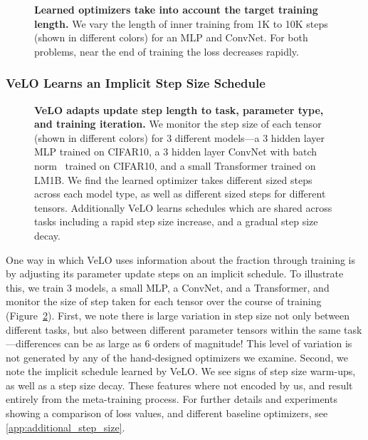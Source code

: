 \documentclass[11pt]{article}
\begin{document}
\begin{figure}
    \centering
    \caption{\textbf{Learned optimizers take into account the target training length.} We vary the length of inner training from 1K to 10K steps (shown in different colors) for an MLP and ConvNet.
    For both problems, near the end of training the loss decreases rapidly.
    \label{fig:num_step_aware}
    }
\end{figure}

\subsubsection{VeLO Learns an Implicit Step Size Schedule}\label{sec:different_sized_steps}
\begin{figure}
    \centering
    \caption{\textbf{VeLO adapts update step length to task, parameter type, and training iteration.}
    We monitor the step size of each tensor (shown in different colors) for 3 different models---a 3 hidden layer MLP trained on CIFAR10, a 3 hidden layer ConvNet with batch norm~\citep{Ioffe15} trained on CIFAR10, and a small Transformer trained on LM1B.
    We find the learned optimizer takes different sized steps across each model type, as well as different sized steps for different tensors.
    Additionally VeLO learns schedules which are shared across tasks including a rapid step size increase, and a gradual step size decay.
    \label{fig:3step_size}
    }
\end{figure}
One way in which VeLO uses information about the fraction through training is by adjusting its parameter update steps on an implicit schedule. 
To illustrate this, we train 3 models, a small MLP, a ConvNet, and a Transformer, and monitor the size of step taken for each tensor over the course of training (Figure~\ref{fig:3step_size}).
First, we note there is large variation in step size not only between different tasks, but also between different parameter tensors within the same task---differences can be as large as 6 orders of magnitude!
This level of variation is not generated by any of the hand-designed optimizers we examine.
Second, we note the implicit schedule learned by VeLO. We see signs of step size warm-ups, as well as a step size decay.
These features where not encoded by us, and result entirely from the meta-training process.
For further details and experiments showing a comparison of loss values, and different baseline optimizers, see \ref{app:additional_step_size}.
\end{document}
